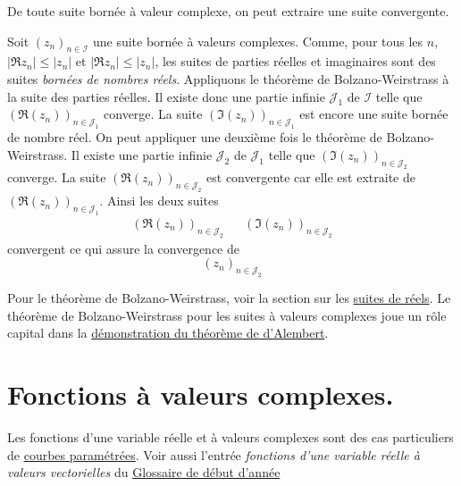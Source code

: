 \begin{thm}
 De toute suite bornée à valeur complexe, on peut extraire une suite convergente.
\end{thm}
\begin{demo}
 Soit $(z_n)_{n\in \mathcal I}$ une suite bornée à valeurs complexes. Comme, pour tous les $n$, $|\Re z_n |\leq |z_n|$ et $|\Re z_n |\leq |z_n|$, les suites de parties réelles et imaginaires sont des suites \emph{bornées de nombres réels}.\newline
Appliquons le théorème de Bolzano-Weirstrass à la suite des parties réelles. Il existe donc une partie infinie $\mathcal J_1$ de $\mathcal I$ telle que  $(\Re(z_n))_{n\in \mathcal J_1}$ converge.\newline
La suite $(\Im(z_n))_{n\in \mathcal J_1}$ est encore une suite bornée de nombre réel. On peut appliquer une deuxième fois le théorème de Bolzano-Weirstrass. Il existe une partie infinie $\mathcal J_2$ de $\mathcal J_1$ telle que  $(\Im(z_n))_{n\in \mathcal J_2}$ converge.\newline
La suite $(\Re(z_n))_{n\in \mathcal J_2}$ est convergente car elle est extraite de $(\Re(z_n))_{n\in \mathcal J_1}$. Ainsi les deux suites 
\begin{align*}
 (\Re(z_n))_{n\in \mathcal J_2} & & (\Im(z_n))_{n\in \mathcal J_2}
\end{align*}
convergent ce qui assure la convergence de
\begin{displaymath}
 (z_n)_{n\in \mathcal J_2}
\end{displaymath}
\end{demo}
Pour le théorème de Bolzano-Weirstrass, voir la section sur les \href{\baseurl C2069.pdf}{suites de réels}.\newline
Le théorème de Bolzano-Weirstrass pour les suites à valeurs complexes joue un rôle capital dans la \href{\baseurl C5213.pdf}{démonstration du théorème de d'Alembert}. 

\section{Fonctions à valeurs complexes.}
Les fonctions d'une variable réelle et à valeurs complexes sont des cas particuliers de \href{\baseurl C1618.pdf}{courbes paramétrées}. Voir aussi l'entrée \emph{fonctions d'une variable réelle à valeurs vectorielles} du \href{\baseurl C4199.pdf}{Glossaire de début d'année}
